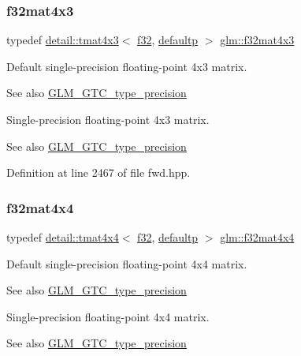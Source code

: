 \subsubsection{\texorpdfstring{f32mat4x3}{f32mat4x3}}
{\footnotesize\ttfamily typedef \hyperlink{structglm_1_1detail_1_1tmat4x3}{detail\+::tmat4x3}$<$ \hyperlink{group__gtc__type__precision_ga0ec999b57f5330d9021256e96038df04}{f32}, \hyperlink{namespaceglm_a0f04f086094c747d227af4425893f545a9d21ccd8b5a009ec7eb7677befc3bf51}{defaultp} $>$ \hyperlink{group__gtc__type__precision_ga5102ae88531e072efe57e75354e10347}{glm\+::f32mat4x3}}

Default single-\/precision floating-\/point 4x3 matrix. \begin{DoxySeeAlso}{See also}
\hyperlink{group__gtc__type__precision}{G\+L\+M\+\_\+\+G\+T\+C\+\_\+type\+\_\+precision}
\end{DoxySeeAlso}
Single-\/precision floating-\/point 4x3 matrix. \begin{DoxySeeAlso}{See also}
\hyperlink{group__gtc__type__precision}{G\+L\+M\+\_\+\+G\+T\+C\+\_\+type\+\_\+precision} 
\end{DoxySeeAlso}


Definition at line 2467 of file fwd.\+hpp.

\mbox{\label{group__gtc__type__precision_ga939fc7fbeb62575aca543d3a0342d807}} 
\subsubsection{\texorpdfstring{f32mat4x4}{f32mat4x4}}
{\footnotesize\ttfamily typedef \hyperlink{structglm_1_1detail_1_1tmat4x4}{detail\+::tmat4x4}$<$ \hyperlink{group__gtc__type__precision_ga0ec999b57f5330d9021256e96038df04}{f32}, \hyperlink{namespaceglm_a0f04f086094c747d227af4425893f545a9d21ccd8b5a009ec7eb7677befc3bf51}{defaultp} $>$ \hyperlink{group__gtc__type__precision_ga939fc7fbeb62575aca543d3a0342d807}{glm\+::f32mat4x4}}

Default single-\/precision floating-\/point 4x4 matrix. \begin{DoxySeeAlso}{See also}
\hyperlink{group__gtc__type__precision}{G\+L\+M\+\_\+\+G\+T\+C\+\_\+type\+\_\+precision}
\end{DoxySeeAlso}
Single-\/precision floating-\/point 4x4 matrix. \begin{DoxySeeAlso}{See also}
\hyperlink{group__gtc__type__precision}{G\+L\+M\+\_\+\+G\+T\+C\+\_\+type\+\_\+precision} 
\end{DoxySeeAlso}


